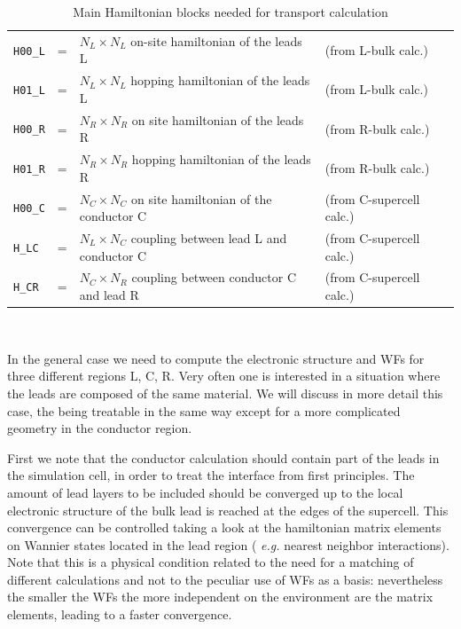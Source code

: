 %
%
\begin{table}[h]
%
\begin{tabular}{lllll}
\texttt{H00\_L} &=& $N_L\times N_L$ on-site hamiltonian
of the leads L & (from L-bulk calc.)\\
\texttt{H01\_L} &=& $N_L\times N_L$ hopping hamiltonian
of the leads L & (from L-bulk calc.) \\
\texttt{H00\_R} &=& $N_R\times N_R$ on site hamiltonian
of the leads R & (from R-bulk calc.) \\
\texttt{H01\_R} &=& $N_R\times N_R$ hopping hamiltonian
of the leads R & (from R-bulk calc.) \\
\texttt{H00\_C} &=& $N_C\times N_C$ on site hamiltonian
of the conductor C & (from C-supercell calc.) \\
\texttt{H\_LC}  &=& $N_L\times N_C$ coupling
between lead L and conductor C & (from C-supercell calc.) \\
\texttt{H\_CR}  &=& $N_C\times N_R$ coupling
between conductor C and lead R & (from C-supercell calc.)
%
%
\end{tabular} \\
%
\caption {Main Hamiltonian blocks needed for transport calculation
          \label{tab:hamiltonian_blocks} }
\end{table}
%
%
%
\noindent In the general case we need to compute the electronic
structure and WFs for three different regions L, C, R. Very often
one is interested in a situation where the leads are composed of
the same material. We will discuss in more detail this case, the
being treatable in the same way except for a more complicated
geometry in the conductor region.

First we note that the conductor calculation should contain part
of the leads in the simulation cell, in order to treat the
interface from first principles. The amount of lead layers to be
included should be converged up to the local electronic structure
of the bulk lead is reached at the edges of the supercell. This
convergence can be controlled taking a look at the hamiltonian
matrix elements on Wannier states located in the lead region ({\it
e.g.} nearest neighbor interactions). Note that this is a physical
condition related to the need for a matching of different
calculations and not to the peculiar use of WFs as a basis:
nevertheless the smaller the WFs the more independent on the
environment are the matrix elements, leading to a faster
convergence.

